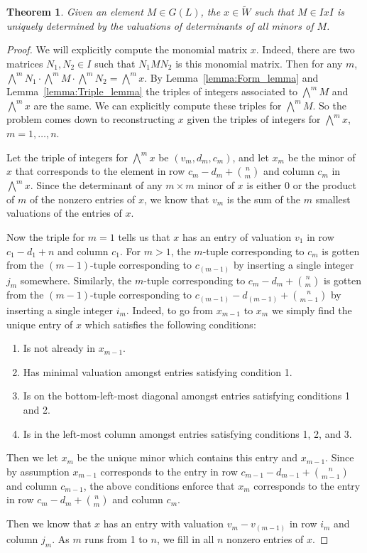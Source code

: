 \documentclass{amsart}
\newtheorem{theorem}{Theorem}
\theoremstyle{definition}
\def\W{\widetilde{W}}
\def\bw{\bigwedge^m\!}
\begin{document}
  \begin{theorem}
    \label{thm:DeterminingIwahoriDoubleCosetForElement}
    Given an element $M \in G(L)$, the $x \in \W$ such that $M \in IxI$ is
    uniquely determined by the valuations of determinants of all minors of $M$.
  \end{theorem}
  \begin{proof}
    We will explicitly compute the monomial matrix $x$.  Indeed, there are two
    matrices $N_1, N_2 \in I$ such that $N_1 M N_2$ is this monomial matrix.
    Then for any $m$, $\bw N_1 \cdot \bw M \cdot \bw N_2 = \bw x$.  By
    Lemma~\ref{lemma:Form_lemma} and Lemma~\ref{lemma:Triple_lemma} the triples
    of integers associated to $\bw M$ and $\bw x$ are the same.  We can
    explicitly compute these triples for $\bw M$.  So the problem comes down to
    reconstructing $x$ given the triples of integers for $\bw x$, $m = 1,
    \ldots, n$.

    Let the triple of integers for $\bw x$ be $(v_m, d_m, c_m)$, and let $x_m$
    be the minor of $x$ that corresponds to the element in row $c_m - d_m +
    \binom{n}{m}$ and column $c_m$ in $\bw x$.  Since the determinant of any
    $m\times m$ minor of $x$ is either 0 or the product of $m$ of the nonzero
    entries of $x$, we know that $v_m$ is the sum of the $m$ smallest
    valuations of the entries of $x$.
  
    Now the triple for $m=1$ tells us that $x$ has an entry of valuation $v_1$
    in row $c_1 - d_1 + n$ and column $c_1$.  For $m > 1$, the $m$-tuple
    corresponding to $c_m$ is gotten from the $(m-1)$-tuple corresponding to
    $c_{(m-1)}$ by inserting a single integer $j_m$ somewhere.  Similarly, the
    $m$-tuple corresponding to $c_m - d_m + \binom{n}{m}$ is gotten from the
    $(m-1)$-tuple corresponding to $c_{(m-1)} - d_{(m-1)} + \binom{n}{m-1}$ by
    inserting a single integer $i_m$.  Indeed, to go from $x_{m-1}$ to $x_m$ we
    simply find the unique entry of $x$ which satisfies the following
    conditions:
    \begin{enumerate}
      \item Is not already in $x_{m-1}$.
      \item Has minimal valuation amongst entries satisfying condition 1.
      \item Is on the bottom-left-most diagonal amongst entries satisfying
	conditions 1 and 2.
      \item Is in the left-most column amongst entries satisfying
	conditions 1, 2, and 3.
    \end{enumerate}
    Then we let $x_m$ be the unique minor which contains this entry and
    $x_{m-1}$.  Since by assumption $x_{m-1}$ corresponds to the entry in row
    $c_{m-1} - d_{m-1} + \binom{n}{m-1}$ and column $c_{m-1}$, the above
    conditions enforce that $x_m$ corresponds to the entry in row $c_m - d_m +
    \binom{n}{m}$ and column $c_m$.

    Then we know that $x$ has an entry with valuation $v_m - v_{(m-1)}$ in row
    $i_m$ and column $j_m$.  As $m$ runs from 1 to $n$, we fill in all $n$
    nonzero entries of $x$.
  \end{proof}
\end{document}
